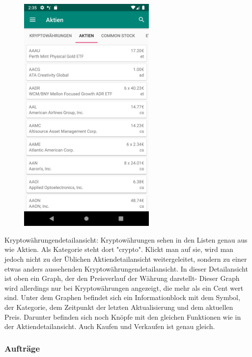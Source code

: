 \documentclass[10pt]{scrartcl}
\begin{document}
\begin{figure}[H]
	\centering
	\includegraphics[width=0.6\textwidth]{Bilder/Applikation/Aktien.png}
\end{figure}

Kryptowährungendetailansicht:
Kryptowährungen sehen in den Listen genau aus wie Aktien. Als Kategorie steht dort "crypto". Klickt man auf sie, wird man jedoch nicht zu der Üblichen Aktiendetailansicht weitergeleitet, sondern zu einer etwas anders aussehenden Kryptowährungendetailansicht.
In dieser Detailansicht ist oben ein Graph, der den Preisverlauf der Währung darstellt- Dieser Graph wird allerdings nur bei Kryptowährungen angezeigt, die mehr als ein Cent wert sind. Unter dem Graphen befindet sich ein Informationblock mit dem Symbol, der Kategorie, dem Zeitpunkt der letzten Aktualisierung und dem aktuellen Preis.
Darunter befinden sich noch Knöpfe mit den gleichen Funktionen wie in der Aktiendetailansicht. Auch Kaufen und Verkaufen ist genau gleich.


\subsubsection{Aufträge}
\end{document}
